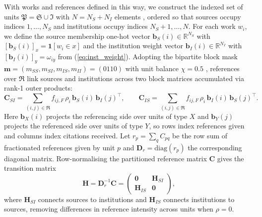 With works and references defined in this way, we construct the indexed set of units $\mathfrak{P} = \mathfrak{S} \cup \mathfrak{I}$ with $N = N_S + N_I$ elements \citep{pinskiCitationInfluenceJournal1976}, ordered so that sources occupy indices $1, \dots, N_S$ and institutions occupy indices $N_S + 1, \dots, N$. For each work $w_i$, we define the source membership one-hot vector $\mathbf{b}_S(i) \in \mathbb{R}^{N_S}$ with $[\mathbf{b}_S(i)]_x = \mathbf{1}[w_i \in x]$ and the institution weight vector $\mathbf{b}_I(i) \in \mathbb{R}^{N_I}$ with $[\mathbf{b}_I(i)]_y = \omega_{iy}$ from (\ref{eq:inst_weight}). Adopting the bipartite block mask $\mathbf{m} = (m_{SS}, m_{SI}, m_{IS}, m_{II}) = (0110)$ with unit balance $\chi = 0.5$ \citep{docampodomingoRecirculatingCardinalSpectral2026}, references over $\mathfrak{R}$ link sources and institutions across two block matrices accumulated via rank-1 outer products:
\begin{equation}
    \mathbf{C}_{SI} = \sum_{(i,j) \in \mathfrak{R}} f_{ij,F}\, \rho_i\, \mathbf{b}_S(i)\, \mathbf{b}_I(j)^\top, \qquad
    \mathbf{C}_{IS} = \sum_{(i,j) \in \mathfrak{R}} f_{ij,F}\, \rho_i\, \mathbf{b}_I(i)\, \mathbf{b}_S(j)^\top.
    \label{eq:c_blocks}
\end{equation}
Here $\mathbf{b}_X(i)$ projects the referencing side over units of type $X$ and $\mathbf{b}_Y(j)$ projects the referenced side over units of type $Y$, so rows index references given and columns index citations received. Let $r_p = \sum_q C_{pq}$ be the row sum of fractionated references given by unit $p$ and $\mathbf{D}_r = \mathrm{diag}(r_p)$ the corresponding diagonal matrix. Row-normalising the partitioned reference matrix $\mathbf{C}$ gives the transition matrix
\begin{equation}
    \mathbf{H} = \mathbf{D}_r^{-1} \mathbf{C} = \begin{pmatrix} \mathbf{0} & \mathbf{H}_{SI} \\ \mathbf{H}_{IS} & \mathbf{0} \end{pmatrix},
    \label{eq:h_bipartite}
\end{equation}
where $\mathbf{H}_{SI}$ connects sources to institutions and $\mathbf{H}_{IS}$ connects institutions to sources, removing differences in reference intensity across units when $\rho = 0$.

